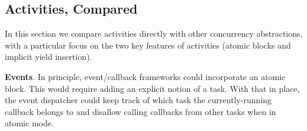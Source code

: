 \documentclass[preprint, 10pt, numbers]{sigplanconf}
\begin{document}



\subsection{Activities, Compared}

In this section we compare activities directly with other concurrency abstractions, with a particular focus on the two key features of activities (atomic blocks and implicit yield insertion).

\textbf{Events}.
In principle, event/callback frameworks could incorporate an atomic block.
This would require adding an explicit notion of a task.
With that in place, the event dispatcher could keep track of which task the currently-running callback belongs to and disallow calling callbacks from other tasks when in atomic mode.
\end{document}
